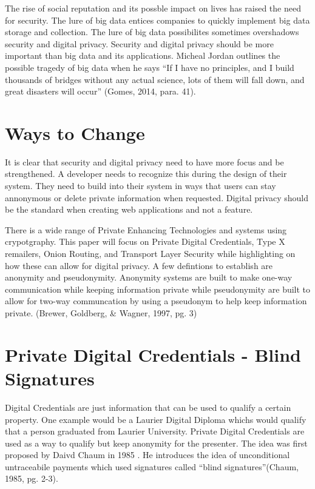 \documentclass[12pt]{article}
\begin{document}
The rise of social reputation and its possble impact on lives has raised the need for security. The lure of big data entices companies to quickly implement big data storage and collection. The lure of big data possibilites sometimes overshadows security and digital privacy. Security and digital privacy should be more important than big data and its applications. Micheal Jordan outlines the possible tragedy of big data when he says ``If I have no principles, and I build thousands of bridges without any actual science, lots of them will fall down, and great disasters will occur'' (Gomes, 2014, para. 41).

\section{Ways to  Change}\label{sec:developers}
It is clear that security and digital privacy need to have more focus and be strengthened. A developer needs to recognize this during the design of their system. They need to build into their system in ways that users can stay annonymous or delete private information when requested. Digital privacy should be the standard when creating web applications and not a feature.

There is a wide range of Private Enhancing Technologies and systems using crypotgraphy. This paper will focus on Private Digital Credentials, Type X remailers, Onion Routing, and Transport Layer Security while highlighting on how these can allow for digital privacy. A few defintions to establish are anonymity and pseudonymity. Anonymity systems are built to make one-way communication while keeping information private while pseudonymity are built to allow for two-way communcation by using a pseudonym to help keep information private. (Brewer, Goldberg, \& Wagner, 1997, pg. 3)

\section{Private Digital Credentials - Blind Signatures}\label{sec:PDC}
Digital Credentials are just information that can be used to qualify a certain property. One example would be a Laurier Digital Diploma whichs would qualify that a person graduated from Laurier University.  Private Digital Credentials are used as a way to qualify but keep anonymity for the presenter. The idea was first proposed by Daivd Chaum in 1985 . He introduces the idea of unconditional untraceabile payments which used signatures called ``blind signatures''(Chaum, 1985, pg. 2-3). 
\end{document}
